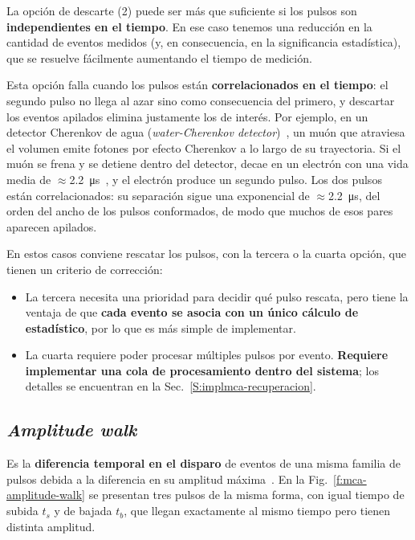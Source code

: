 La opción de descarte (2) puede ser más que suficiente si los pulsos son
\textbf{independientes en el tiempo}. En ese caso tenemos una reducción en la
cantidad de eventos medidos (y, en consecuencia, en la significancia
estadística), que se resuelve fácilmente aumentando el tiempo de medición.

Esta opción falla cuando los pulsos están \textbf{correlacionados en el tiempo}:
el segundo pulso no llega al azar sino como consecuencia del primero, y
descartar los eventos apilados elimina justamente los de interés. Por ejemplo,
en un detector Cherenkov de agua (\emph{water-Cherenkov
detector})~\cite{Allison2005}, un muón que atraviesa el volumen emite fotones
por efecto Cherenkov a lo largo de su trayectoria. Si el muón se frena y se
detiene dentro del detector, decae en un electrón con una vida media de
$\approx$\qty{2.2}{\micro\second}~\cite{PDG2024}, y el electrón produce un
segundo pulso. Los dos pulsos están correlacionados: su separación sigue una
exponencial de $\approx$\qty{2.2}{\micro\second}, del orden del ancho de los
pulsos conformados, de modo que muchos de esos pares aparecen apilados.

En estos casos conviene rescatar los pulsos, con la tercera o la cuarta opción,
que tienen un criterio de corrección:
\begin{itemize}
  \item La tercera necesita una prioridad para decidir qué pulso rescata, pero
    tiene la ventaja de que \textbf{cada evento se asocia con un único cálculo
    de estadístico}, por lo que es más simple de implementar.
  \item La cuarta requiere poder procesar múltiples pulsos por evento.
    \textbf{Requiere implementar una cola de procesamiento dentro del sistema};
    los detalles se encuentran en la
    Sec.~\ref{S:implmca-recuperacion}.
\end{itemize}

\subsection{\texorpdfstring{\emph{Amplitude walk}}{\emph{Amplitude walk}}}
\label{S:mca-amplitude-walk}

Es la \textbf{diferencia temporal en el disparo} de eventos de una misma familia
de pulsos debida a la diferencia en su amplitud máxima~\cite{Knoll2010}. En la
Fig.~\ref{f:mca-amplitude-walk} se presentan tres pulsos de la misma forma, con
igual tiempo de subida $t_s$ y de bajada $t_b$, que llegan exactamente al mismo
tiempo pero tienen distinta amplitud.

